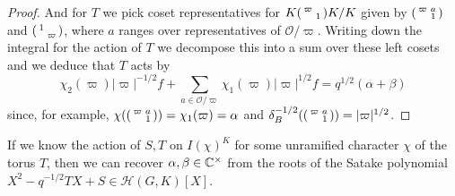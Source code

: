 \begin{proof}
    And for $T$ we pick coset representatives for $K\begin{psmallmatrix}\varpi & \\ & 1\end{psmallmatrix}K/K$ given by $\begin{psmallmatrix}\varpi &a \\ & 1\end{psmallmatrix}$ and $\begin{psmallmatrix}1 & \\ & \varpi\end{psmallmatrix}$, where $a$ ranges over representatives of $\mathcal O/\varpi$. Writing down the integral for the action of $T$ we decompose this into a sum over these left cosets and we deduce that $T$ acts by
    $$\chi_2(\varpi)|\varpi|^{-1/2}f + \sum\limits_{a \in \mathcal O/\varpi} \chi_1(\varpi)|\varpi|^{1/2}f = q^{1/2}(\alpha+\beta)$$
    since, for example, $\chi(\begin{psmallmatrix}\varpi & a\\ & 1\end{psmallmatrix})=\chi_1(\varpi)=\alpha$ and $\delta_B^{-1/2}(\begin{psmallmatrix}\varpi & a\\ & 1\end{psmallmatrix}) = |\varpi|^{1/2}$.
\end{proof}
\begin{rem}
    If we know the action of $S,T$ on $I(\chi)^K$ for some unramified character $\chi$ of the torus $T$, then we can recover $\alpha,\beta \in \mathbb{C}^\times$ from the roots of the Satake polynomial $X^2-q^{-1/2}TX+S \in \mathcal H(G,K)[X]$.
\end{rem}

\newpage